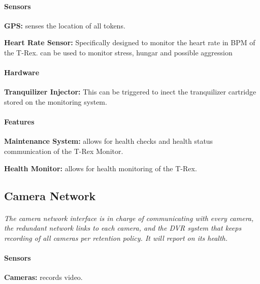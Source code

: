 \documentclass[12pt]{article}
\begin{document}
	\paragraph{Sensors}
	\begin{list}{}{}
		\item \textbf{GPS: } senses the location of all tokens.
		\item \textbf{Heart Rate Sensor: } Specifically designed to monitor the heart rate in BPM of the T-Rex. can be used to monitor stress, hungar and possible aggression
	\end{list}
		
	\paragraph{Hardware}
	\begin{list}{}{}
		\item \textbf{Tranquilizer Injector: } This can be triggered to inect the tranquilizer cartridge stored on the monitoring system.
	\end{list}

	\paragraph{Features}
	\begin{list}{}{}
		\item \textbf{Maintenance System: }allows for health checks and health status communication of the T-Rex Monitor.  
		\item \textbf{Health Monitor: }allows for health monitoring of the T-Rex.
	\end{list}

	\subsection{Camera Network}
	\paragraph{} \textit{The camera network interface is in charge of communicating with every camera, the redundant network links to each camera, and the DVR system that keeps recording of all cameras per retention policy. It will report on its health.}		
	
	\paragraph{Sensors}
	\begin{list}{}{}
		\item \textbf{Cameras: }records video. 
	\end{list}
		
\end{document}
